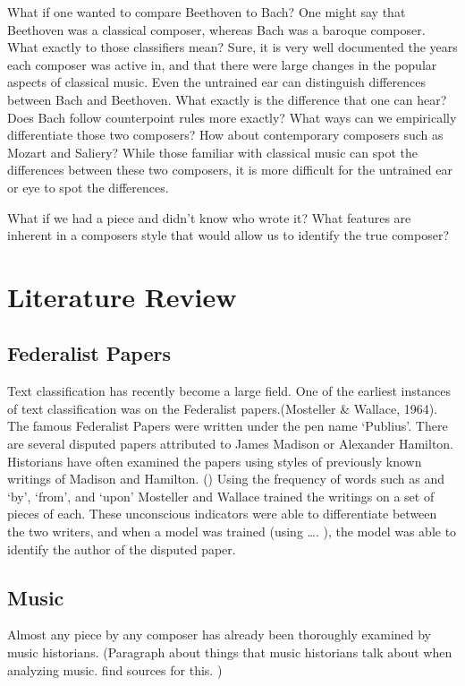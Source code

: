\documentclass[12pt,twoside]{reedthesis}
\theoremstyle{definition}
\theoremstyle{definition}
\theoremstyle{definition}
\theoremstyle{remark}
\begin{document}
What if one wanted to compare Beethoven to Bach? One might say that
Beethoven was a classical composer, whereas Bach was a baroque composer.
What exactly to those classifiers mean? Sure, it is very well documented
the years each composer was active in, and that there were large changes
in the popular aspects of classical music. Even the untrained ear can
distinguish differences between Bach and Beethoven. What exactly is the
difference that one can hear? Does Bach follow counterpoint rules more
exactly? What ways can we empirically differentiate those two composers?
How about contemporary composers such as Mozart and Saliery? While those
familiar with classical music can spot the differences between these two
composers, it is more difficult for the untrained ear or eye to spot the
differences.

What if we had a piece and didn't know who wrote it? What features are
inherent in a composers style that would allow us to identify the true
composer?

\section{Literature Review}\label{literature-review}

\subsection{Federalist Papers}\label{federalist-papers}

Text classification has recently become a large field. One of the
earliest instances of text classification was on the Federalist
papers.(Mosteller \& Wallace, 1964). The famous Federalist Papers were
written under the pen name `Publius'. There are several disputed papers
attributed to James Madison or Alexander Hamilton. Historians have often
examined the papers using styles of previously known writings of Madison
and Hamilton. () Using the frequency of words such as and `by', `from',
and `upon' Mosteller and Wallace trained the writings on a set of pieces
of each. These unconscious indicators were able to differentiate between
the two writers, and when a model was trained (using \ldots{}. ), the
model was able to identify the author of the disputed paper.

\subsection{Music}\label{music}

Almost any piece by any composer has already been thoroughly examined by
music historians. (Paragraph about things that music historians talk
about when analyzing music. find sources for this. )
\end{document}
